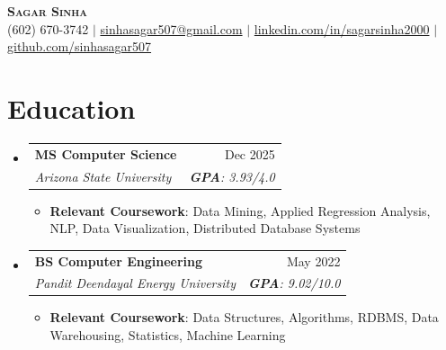 \documentclass[letterpaper,9pt]{article}
\makeatletter
\newcommand{\resumeItem}[1]{
  \item\small{
    {#1 \vspace{-2pt}}
  }
}
\newcommand{\resumeSubheading}[4]{
  \vspace{-2pt}\item
    \begin{tabular*}{0.97\textwidth}[t]{l@{\extracolsep{\fill}}r}
      \textbf{#1} & {\small #2} \\
      \textit{\small#3} & \textit{\small #4} \\
    \end{tabular*}\vspace{-7pt}
}
\newcommand{\resumeSubHeadingListStart}{\begin{itemize}[leftmargin=0.15in, label={}]}
\newcommand{\resumeSubHeadingListEnd}{\end{itemize}}
\newcommand{\resumeItemListStart}{\begin{itemize}}
\newcommand{\resumeItemListEnd}{\end{itemize}\vspace{-5pt}}
\makeatother
\begin{document}
\vspace*{-15pt} 
\begin{center}
    \textbf{\Huge \scshape Sagar Sinha} \\ \vspace{2pt}
    \small (602) 670-3742 $|$
    \href{mailto:sinhasagar507@gmail.com}{sinhasagar507@gmail.com} $|$
    \href{https://linkedin.com/in/sagarsinha2000}{linkedin.com/in/sagarsinha2000} $|$
    \href{https://github.com/sinhasagar507}{github.com/sinhasagar507}
\end{center}



\section{Education}
  \resumeSubHeadingListStart
    \resumeSubheading
      {MS Computer Science}{Dec 2025}
      {Arizona State University}{\textbf{GPA}: 3.93/4.0}
      \vspace{1pt}
      \resumeItemListStart
        \resumeItem{\textbf{Relevant Coursework}: Data Mining, Applied Regression Analysis, NLP, Data Visualization, Distributed Database Systems}
      \resumeItemListEnd

    \resumeSubheading
      {BS Computer Engineering}{May 2022}
      {Pandit Deendayal Energy University}{\textbf{GPA}: 9.02/10.0}
      \vspace{1pt}
      \resumeItemListStart
        \resumeItem{\textbf{Relevant Coursework}: Data Structures, Algorithms, RDBMS, Data Warehousing, Statistics, Machine Learning}
      \resumeItemListEnd
  \resumeSubHeadingListEnd

\end{document}
